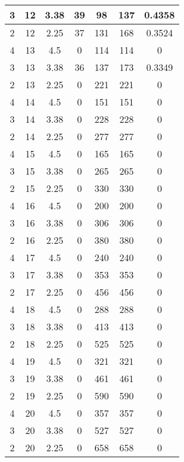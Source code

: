 \documentclass[letterpaper, 12pt]{article}
\begin{document}
\begin{longtable}{|c|c|c|c|c|c|c|}
\hline
3 & 12 & 3.38 & 39 & 98 & 137 & 0.4358 \\
\hline
2 & 12 & 2.25 & 37 & 131 & 168 & 0.3524 \\
\hline
4 & 13 & 4.5 & 0 & 114 & 114 & 0 \\
\hline
3 & 13 & 3.38 & 36 & 137 & 173 & 0.3349 \\
\hline
2 & 13 & 2.25 & 0 & 221 & 221 & 0 \\
\hline
4 & 14 & 4.5 & 0 & 151 & 151 & 0 \\
\hline
3 & 14 & 3.38 & 0 & 228 & 228 & 0 \\
\hline
2 & 14 & 2.25 & 0 & 277 & 277 & 0 \\
\hline
4 & 15 & 4.5 & 0 & 165 & 165 & 0 \\
\hline
3 & 15 & 3.38 & 0 & 265 & 265 & 0 \\
\hline
2 & 15 & 2.25 & 0 & 330 & 330 & 0 \\
\hline
4 & 16 & 4.5 & 0 & 200 & 200 & 0 \\
\hline
3 & 16 & 3.38 & 0 & 306 & 306 & 0 \\
\hline
2 & 16 & 2.25 & 0 & 380 & 380 & 0 \\
\hline
4 & 17 & 4.5 & 0 & 240 & 240 & 0 \\
\hline
3 & 17 & 3.38 & 0 & 353 & 353 & 0 \\
\hline
2 & 17 & 2.25 & 0 & 456 & 456 & 0 \\
\hline
4 & 18 & 4.5 & 0 & 288 & 288 & 0 \\
\hline
3 & 18 & 3.38 & 0 & 413 & 413 & 0 \\
\hline
2 & 18 & 2.25 & 0 & 525 & 525 & 0 \\
\hline
4 & 19 & 4.5 & 0 & 321 & 321 & 0 \\
\hline
3 & 19 & 3.38 & 0 & 461 & 461 & 0 \\
\hline
2 & 19 & 2.25 & 0 & 590 & 590 & 0 \\
\hline
4 & 20 & 4.5 & 0 & 357 & 357 & 0 \\
\hline
3 & 20 & 3.38 & 0 & 527 & 527 & 0 \\
\hline
2 & 20 & 2.25 & 0 & 658 & 658 & 0 \\
\hline
\end{longtable}
\end{document}
